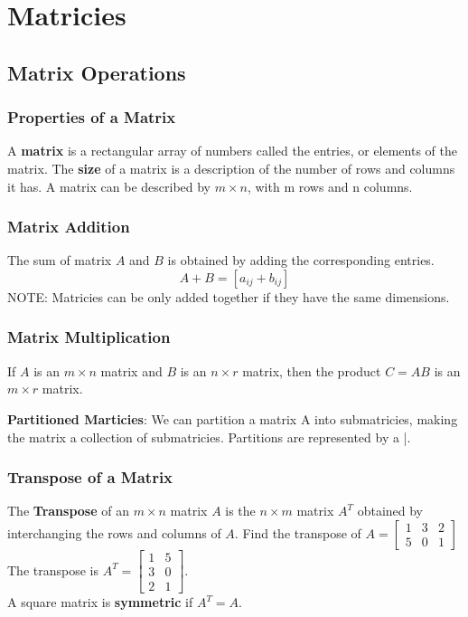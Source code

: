 \setcounter{chapter}{2}
\chapter{Matricies}

\section{Matrix Operations}

\subsection*{Properties of a Matrix}
A \textbf{matrix} is a rectangular array of numbers called the entries, or elements of the matrix. The \textbf{size} of a matrix is a description
of the number of rows and columns it has. A matrix can be described by $m\times n$, with m rows and n columns.
\subsection*{Matrix Addition}
The sum of matrix $A$ and $B$ is obtained by adding the corresponding entries.
$$A+B = [a_{ij} + b_{ij}]$$
NOTE: Matricies can be only added together if they have the same dimensions.

\subsection*{Matrix Multiplication}
If $A$ is an $m\times n$ matrix and $B$ is an $n\times r$ matrix, then the product $C = AB$ is an $m\times r$ matrix.

\textbf{Partitioned Marticies}: We can partition a matrix A into submatricies, making the matrix a collection of submatricies. Partitions are represented by a |.
\subsection*{Transpose of a Matrix}
The \textbf{Transpose} of an $m\times n$ matrix $A$ is the $n\times m$ matrix $A^T$ obtained by interchanging the rows and columns of $A$.
Find the transpose of $A = \begin{bmatrix}
    1&3&2\\5&0&1
\end{bmatrix}$\\The transpose is $A^T = \begin{bmatrix}
    1&5\\3&0\\2&1
\end{bmatrix}$.\\
A square matrix is \textbf{symmetric} if $A^T = A$.

